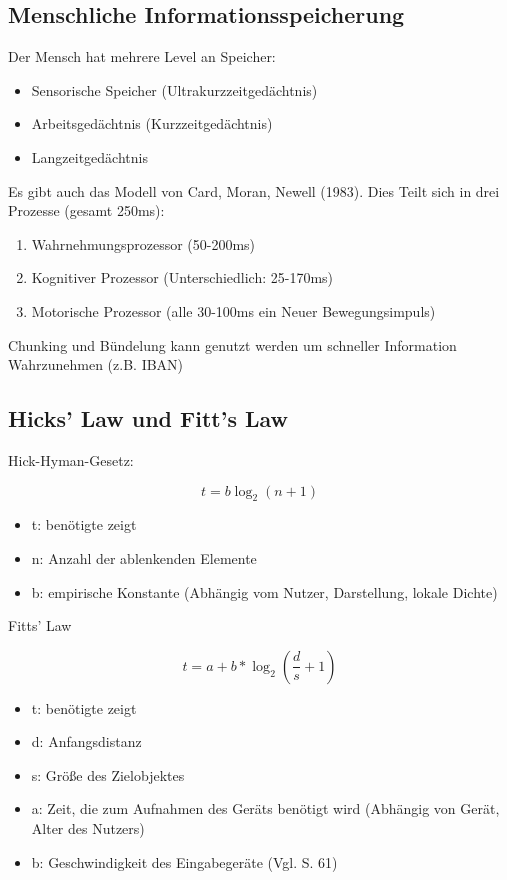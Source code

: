 \documentclass[a4paper]{article}
\begin{document}
\subsection{Menschliche Informationsspeicherung}


Der Mensch hat mehrere Level an Speicher:

\begin{itemize}
    \item Sensorische Speicher (Ultrakurzzeitgedächtnis)
    \item Arbeitsgedächtnis (Kurzzeitgedächtnis)
    \item Langzeitgedächtnis
\end{itemize}

Es gibt auch das Modell von Card, Moran, Newell (1983). Dies Teilt sich in drei Prozesse (gesamt 250ms):

\begin{enumerate}
    \item Wahrnehmungsprozessor (50-200ms)
    \item Kognitiver Prozessor (Unterschiedlich: 25-170ms)
    \item Motorische Prozessor (alle 30-100ms ein Neuer Bewegungsimpuls)
\end{enumerate}

Chunking und Bündelung kann genutzt werden um schneller Information Wahrzunehmen (z.B. IBAN)

\subsection{Hicks' Law und Fitt's Law}

Hick-Hyman-Gesetz:

$$t = b \log_2(n+1)$$

\begin{itemize}
    \item t: benötigte zeigt
    \item n: Anzahl der ablenkenden Elemente
    \item b: empirische Konstante (Abhängig vom Nutzer, Darstellung, lokale Dichte)
\end{itemize}

Fitts' Law

$$t = a + b*\log_2(\frac{d}{s}+1)$$

\begin{itemize}
    \item t: benötigte zeigt
    \item d: Anfangsdistanz
    \item s: Größe des Zielobjektes
    \item a: Zeit, die zum Aufnahmen des Geräts benötigt wird (Abhängig von Gerät, Alter des Nutzers)
    \item b: Geschwindigkeit des Eingabegeräte (Vgl. S. 61)
\end{itemize}
\end{document}
